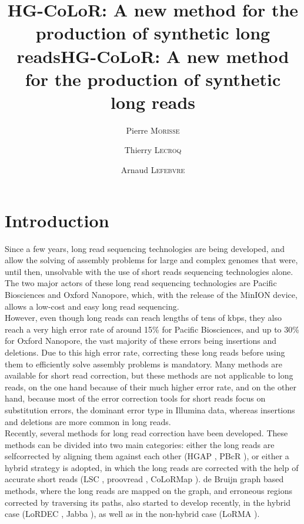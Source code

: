 \documentclass[long, final]{jobim2017}
\title{HG-CoLoR: A new method for the production of synthetic long reads}
\author{Pierre \textsc{Morisse}\inst{1} \and Thierry \textsc{Lecroq}\inst{1} \and Arnaud \textsc{Lefebvre}\inst{1}}
\institute{
 Laboratory, Address, zip code, Town, Country
}
\begin{document}
\pagestyle{plain}


\maketitle

\title{HG-CoLoR: A new method for the production of synthetic long reads}

\section{Introduction}
\label{sec:introduction}

Since a few years, long read sequencing technologies are being developed, and allow the solving of assembly problems for large and complex genomes that were, until then, unsolvable with the use of short reads sequencing technologies alone. The two major actors of these long
read sequencing technologies are Pacific Biosciences and Oxford Nanopore, which, with the release of the MinION device, allows a low-cost and easy long read sequencing. \\
\indent However, even though long reads can reach lengths of tens of kbps, they also reach a very high error rate of around 15\% for Pacific Biosciences, and up to 30\% for Oxford Nanopore, the vast majority of these errors being insertions and deletions. Due to this high error rate, correcting these long reads before using them to efficiently solve assembly problems is mandatory. Many methods are available for short read correction, but these methods are not applicable to long reads, on the one hand because of their much higher error rate, and on the other hand, because most of the error correction tools for short reads focus on substitution errors, the dominant error type in Illumina data, whereas insertions and deletions are more common in long reads. \\
\indent Recently, several methods for long read correction have been developed. These methods can be divided into two main categories: either
the long reads are selfcorrected by aligning them against each other (HGAP \cite{Chin2013}, PBcR \cite{Berlin2015}), or either a hybrid strategy is adopted, in which the long reads are corrected with the help of accurate short reads (LSC \cite{Au2012}, proovread \cite{Hackl2014}, CoLoRMap \cite{Haghshenas2016}). de Bruijn graph \cite{deBruijn1946} based methods, where the long reads are mapped on the graph, and erroneous regions corrected by traversing its paths, also started to develop recently, in the hybrid case (LoRDEC \cite{Salmela2014}, Jabba \cite{Miclotte2016}), as well as in the non-hybrid case (LoRMA \cite{Salmela2016}). \\
\end{document}
